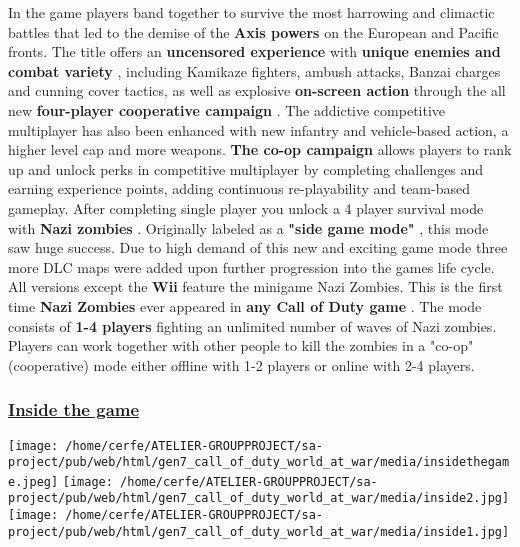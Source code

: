 \documentclass[a4paper,10pt]{book}
\begin{document}
        In the game players band together to survive the most harrowing and climactic battles that led to the demise of the  \textbf{Axis powers } on the European and Pacific fronts.
        The title offers an  \textbf{uncensored experience }  with  \textbf{unique enemies and combat variety } , including Kamikaze fighters, ambush attacks, Banzai charges and cunning cover tactics, as well as explosive  \textbf{on-screen action }  through the all new  \textbf{four-player cooperative campaign } . 
        The addictive competitive multiplayer has also been enhanced with new infantry and vehicle-based action, a higher level cap and more weapons.
         \textbf{The co-op campaign }  allows players to rank up and unlock perks in competitive multiplayer by completing challenges and earning experience points, adding continuous re-playability and team-based gameplay.
        After completing single player you unlock a 4 player survival mode with  \textbf{Nazi zombies } . 
        Originally labeled as a  \textbf{"side game mode" } , this mode saw huge success.
        Due to high demand of this new and exciting game mode three more DLC maps were added upon further progression into the games life cycle.
        All versions except the  \textbf{Wii }  feature the minigame Nazi Zombies. 
        This is the first time  \textbf{Nazi Zombies }  ever appeared in  \textbf{any Call of Duty game } . The mode consists of  \textbf{1-4 players }  fighting an unlimited number of waves of Nazi zombies. Players can work together with other people to kill the zombies in a "co-op" (cooperative) mode either offline with 1-2 players or online with 2-4 players.
         
 \subsubsection{\underline{Inside the game }}
 \texttt{[image: /home/cerfe/ATELIER-GROUPPROJECT/sa-project/pub/web/html/gen7\_call\_of\_duty\_world\_at\_war/media/insidethegame.jpeg]}
 \texttt{[image: /home/cerfe/ATELIER-GROUPPROJECT/sa-project/pub/web/html/gen7\_call\_of\_duty\_world\_at\_war/media/inside2.jpg]}
 \texttt{[image: /home/cerfe/ATELIER-GROUPPROJECT/sa-project/pub/web/html/gen7\_call\_of\_duty\_world\_at\_war/media/inside1.jpg]}
\end{document}
